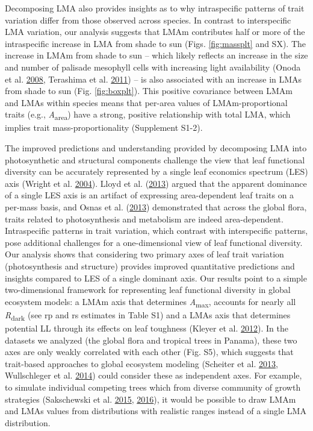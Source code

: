 \documentclass[
  12pt,
]{article}
\begin{document}
Decomposing LMA also provides insights as to why intraspecific patterns of trait variation differ from those observed across species.
In contrast to interspecific LMA variation, our analysis suggests that LMAm contributes half or more of the intraspecific increase in LMA from shade to sun (Figs. \ref{fig:massplt} and SX).
The increase in LMAm from shade to sun -- which likely reflects an increase in the size and number of palisade mesophyll cells with increasing light availability (Onoda et al. \protect\hyperlink{ref-Onoda2008}{2008}, Terashima et al. \protect\hyperlink{ref-Terashima2011}{2011}) -- is also associated with an increase in LMAs from shade to sun (Fig. \ref{fig:boxplt}).
This positive covariance between LMAm and LMAs within species means that per-area values of LMAm-proportional traits (e.g., \emph{A}\textsubscript{area}) have a strong, positive relationship with total LMA, which implies trait mass-proportionality (Supplement S1-2).

The improved predictions and understanding provided by decomposing LMA into photosynthetic and structural components challenge the view that leaf functional diversity can be accurately represented by a single leaf economics spectrum (LES) axis (Wright et al. \protect\hyperlink{ref-Wright2004a}{2004}).
Lloyd et al. (\protect\hyperlink{ref-Lloyd2013}{2013}) argued that the apparent dominance of a single LES axis is an artifact of expressing area-dependent leaf traits on a per-mass basis, and Osnas et al. (\protect\hyperlink{ref-Osnas2013}{2013}) demonstrated that across the global flora, traits related to photosynthesis and metabolism are indeed area-dependent.
Intraspecific patterns in trait variation, which contrast with interspecific patterns, pose additional challenges for a one-dimensional view of leaf functional diversity. Our analysis shows that considering two primary axes of leaf trait variation (photosynthesis and structure) provides improved quantitative predictions and insights compared to LES of a single dominant axis.
Our results point to a simple two-dimensional framework for representing leaf functional diversity in global ecosystem models: a LMAm axis that determines \emph{A}\textsubscript{max}, accounts for nearly all \emph{R}\textsubscript{dark} (see rp and rs estimates in Table S1) and a LMAs axis that determines potential LL through its effects on leaf toughness (Kleyer et al. \protect\hyperlink{ref-Kleyer2012}{2012}).
In the datasets we analyzed (the global flora and tropical trees in Panama), these two axes are only weakly correlated with each other (Fig. S5), which suggests that trait-based approaches to global ecosystem modeling (Scheiter et al. \protect\hyperlink{ref-Scheiter2013}{2013}, Wullschleger et al. \protect\hyperlink{ref-Wullschleger2014}{2014}) could consider these as independent axes.
For example, to simulate individual competing trees which from diverse community of growth strategies (Sakschewski et al. \protect\hyperlink{ref-Sakschewski2015}{2015}, \protect\hyperlink{ref-Sakschewski2016}{2016}), it would be possible to draw LMAm and LMAs values from distributions with realistic ranges instead of a single LMA distribution.
\end{document}
